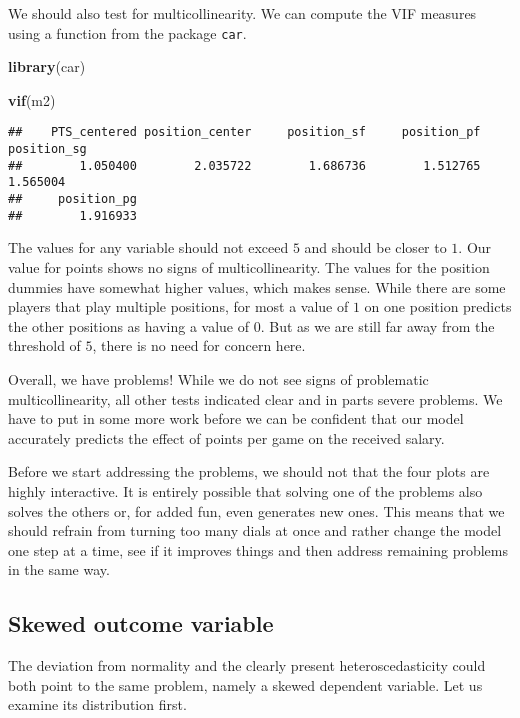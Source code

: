 \documentclass[
]{book}
\newenvironment{Shaded}{\begin{snugshade}}{\end{snugshade}}
\newcommand{\FunctionTok}[1]{\textcolor[rgb]{0.13,0.29,0.53}{\textbf{#1}}}
\newcommand{\NormalTok}[1]{#1}
\begin{document}
We should also test for multicollinearity. We can compute the VIF measures using
a function from the package \texttt{car}.

\begin{Shaded}
\begin{Highlighting}[]
\FunctionTok{library}\NormalTok{(car)}

\FunctionTok{vif}\NormalTok{(m2)}
\end{Highlighting}
\end{Shaded}

\begin{verbatim}
##    PTS_centered position_center     position_sf     position_pf     position_sg 
##        1.050400        2.035722        1.686736        1.512765        1.565004 
##     position_pg 
##        1.916933
\end{verbatim}

The values for any variable should not exceed \(5\) and should be closer to \(1\).
Our value for points shows no signs of multicollinearity. The values for the
position dummies have somewhat higher values, which makes sense. While there are
some players that play multiple positions, for most a value of \(1\) on one
position predicts the other positions as having a value of \(0\). But as we are
still far away from the threshold of \(5\), there is no need for concern here.

Overall, we have problems! While we do not see signs of problematic
multicollinearity, all other tests indicated clear and in parts severe problems.
We have to put in some more work before we can be confident that our model
accurately predicts the effect of points per game on the received salary.

Before we start addressing the problems, we should not that the four plots are
highly interactive. It is entirely possible that solving one of the problems
also solves the others or, for added fun, even generates new ones. This means
that we should refrain from turning too many dials at once and rather change the
model one step at a time, see if it improves things and then address remaining
problems in the same way.

\hypertarget{skewed-outcome-variable}{%
\subsection{Skewed outcome variable}\label{skewed-outcome-variable}}

The deviation from normality and the clearly present heteroscedasticity could
both point to the same problem, namely a skewed dependent variable. Let us
examine its distribution first.
\end{document}
